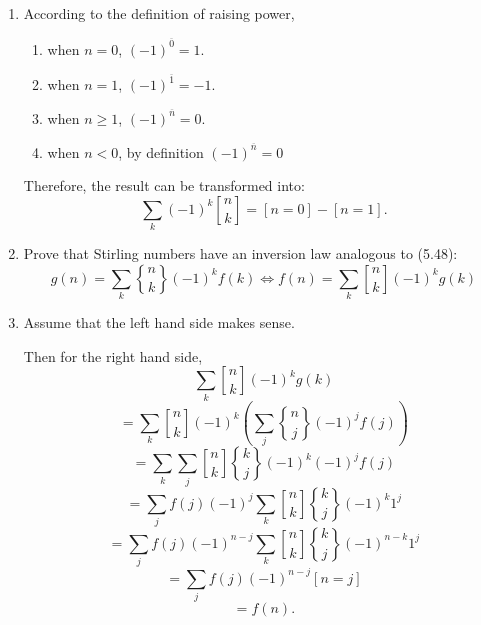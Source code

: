 \documentclass[12pt,a4paper]{article}
\makeatletter
\newtheorem*{solution}{Solution}
\theoremstyle{definition}
\renewenvironment{solution}[1][Solution] {\par\pushQED{\qed}\normalfont\topsep6\p@\@plus6\p@\relax\trivlist\item[\hskip\labelsep\bfseries#1\@addpunct{.}]\ignorespaces}{\popQED\endtrivlist\@endpefalse} \makeatother
\makeatother
\begin{document}
\begin{enumerate}
\begin{solution}
    	According to the definition of raising power, 
    	\begin{enumerate}
    		\item 
    		    when $n=0$, $(-1)^{\overline{0}}=1$.
    		\item 
    		    when $n=1$, $(-1)^{\overline{1}}=-1$.
    		\item 
    		    when $n\ge 1$, $(-1)^{\overline{n}}=0$.
    		\item 
    		    when $n<0$, by definition $(-1)^{\overline{n}}=0$
    	\end{enumerate}
    	Therefore, the result can be transformed into:
       \begin{equation*}
            \sum_k(-1)^k {n \brack k}=[n=0]-[n=1].
         \end{equation*}
      \end{solution}
    \item
    Prove that Stirling numbers have an inversion law analogous to (5.48):
        \begin{equation*}
           g(n)=\sum_k{n \brace k}(-1)^kf(k) \Leftrightarrow f(n)=\sum_k{n \brack k}(-1)^kg(k)
        \end{equation*}
        \begin{solution}
        	Assume that the left hand side makes sense.
        	
        	Then for the right hand side,
        	\begin{equation*}
        	    \sum_k{n \brack k}(-1)^kg(k)
        	\end{equation*}
        	\begin{equation*}
        	    =\sum_k{n \brack k}(-1)^k (\sum_j{n \brace j} (-1)^j f(j))
        	\end{equation*}
        	\begin{equation*}
        	    =\sum_k\sum_j{ n \brack k}{k \brace j} (-1)^k (-1)^j f(j)
        	\end{equation*}
        	\begin{equation*}
        	    =\sum_j f(j) (-1)^j \sum_k {n \brack k}{k \brace j}(-1)^k 1^j
        	\end{equation*}
        	\begin{equation*}
        	    =\sum_j f(j) (-1)^{n-j} \sum_k {n \brack k}{k \brace j}(-1)^{n-k} 1^j
        	\end{equation*}
        	\begin{equation*}
        	    =\sum_j f(j) (-1)^{n-j} [n=j]
        	\end{equation*}
        	\begin{equation*}
        	    =f(n).
        	\end{equation*}
        	

\end{solution}
\end{enumerate}
\end{document}

